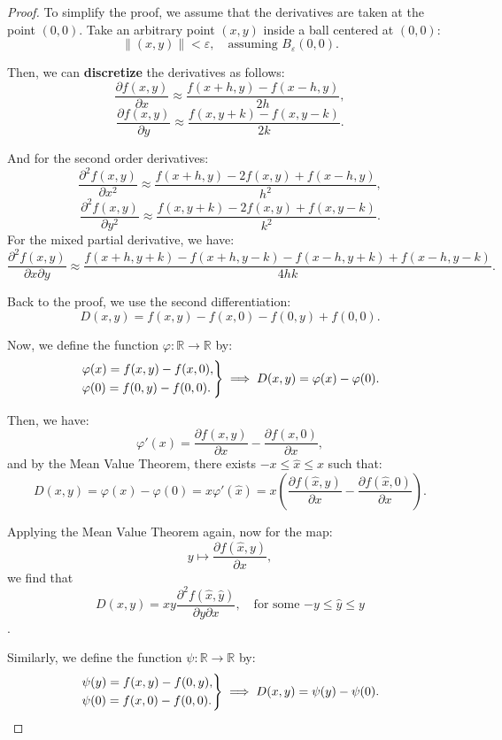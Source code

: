 \documentclass[11pt]{article}
\begin{document}
\begin{proof}
    To simplify the proof, we assume that the derivatives are taken at the point \((0, 0)\). Take an arbitrary point \((x, y)\) inside a ball centered at \((0, 0)\):
    \[
    \|(x, y)\| < \varepsilon, \quad \text{assuming } B_\varepsilon(0, 0).
    \]

    Then, we can \textbf{discretize} the derivatives as follows:
    \[\frac{\partial f(x, y)}{\partial x} \approx \frac{f(x + h, y) - f(x - h, y)}{2h},\]
    \[\frac{\partial f(x, y)}{\partial y} \approx \frac{f(x, y + k) - f(x, y - k)}{2k}.\]

    And for the second order derivatives:
    \[\frac{\partial^2 f(x, y)}{\partial x^2} \approx \frac{f(x + h, y) - 2f(x, y) + f(x - h, y)}{h^2},\]
    \[\frac{\partial^2 f(x, y)}{\partial y^2} \approx \frac{f(x, y + k) - 2f(x, y) + f(x, y - k)}{k^2}.\]
    For the mixed partial derivative, we have:
    \[\frac{\partial^2 f(x, y)}{\partial x \partial y} \approx \frac{f(x + h, y + k) - f(x + h, y - k) - f(x - h, y + k) + f(x - h, y - k)}{4hk}.\]

    Back to the proof, we use the second differentiation:
    \[D(x, y) = f(x, y) - f(x, 0) - f(0, y) + f(0, 0).\]

    Now, we define the function \(\varphi : \mathbb{R} \to \mathbb{R}\) by:
    \[\begin{rcases*} 
    \varphi(x) = f(x, y) - f(x, 0), \\
    \varphi(0) = f(0, y) - f(0, 0).
    \end{rcases*} \implies D(x, y) = \varphi(x) - \varphi(0).\]

    Then, we have:
    \[\varphi'(x) = \frac{\partial f(x, y)}{\partial x} - \frac{\partial f(x, 0)}{\partial x},\]
    and by the Mean Value Theorem, there exists \(-x \leq \hat{x} \leq x\) such that:
    \[D(x, y) = \varphi(x) - \varphi(0) = x \varphi'(\hat{x}) = x \left( \frac{\partial f(\hat{x}, y)}{\partial x} - \frac{\partial f(\hat{x}, 0)}{\partial x} \right).\]

    Applying the Mean Value Theorem again, now for the map:
    \[y \longmapsto \frac{\partial f(\hat{x}, y)}{\partial x},\] 
    we find that
    \[D(x, y) = x y \frac{\partial^2 f(\hat{x}, \hat{y})}{\partial y \partial x}, \quad \text{for some \(-y \leq \hat{y} \leq y\)}\]. 

    Similarly, we define the function \(\psi : \mathbb{R} \to \mathbb{R}\) by:
    \[\begin{rcases*}
    \psi(y) = f(x, y) - f(0, y), \\
    \psi(0) = f(x, 0) - f(0, 0).
    \end{rcases*} \implies D(x, y) = \psi(y) - \psi(0).\]


\end{proof}
\end{document}
